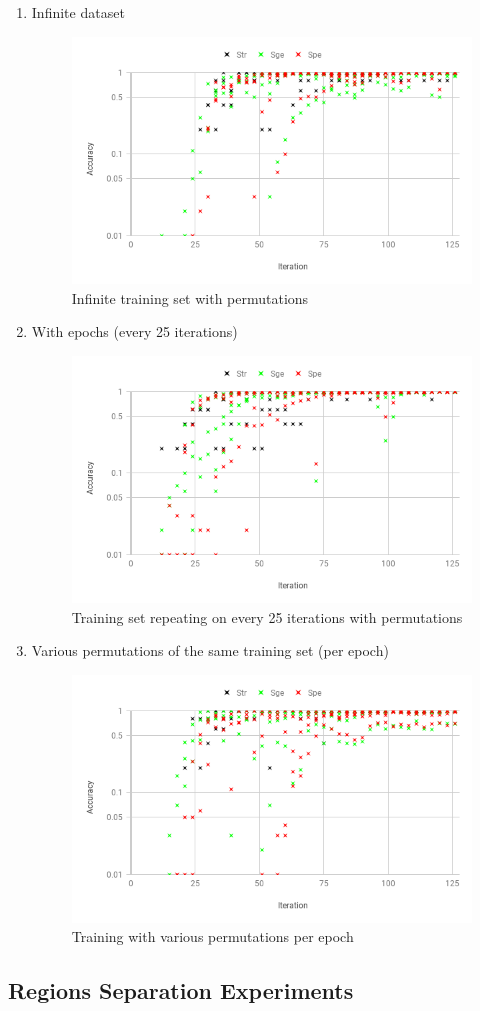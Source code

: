 \begin{itemize}
\begin{enumerate}[label=(\Alph*)]
        \item Infinite dataset
        
        \begin{figure}[H]
            \centering
            \includegraphics[width=.45\linewidth]{fig/content/results/shortest_path/training_perm_ACC.png}
            \caption{Infinite training set with permutations}
            \label{fig:shotest_paths_train_perm_ACC_results}
        \end{figure}
        
        \item With epochs (every 25 iterations)
        
        \begin{figure}[!htb]
            \centering
            \includegraphics[width=.45\linewidth]{fig/content/results/shortest_path/epochs_perm_ACC.png}
            \caption{Training set repeating on every 25 iterations with permutations}
            \label{fig:shotest_paths_epochs_perm_ACC_results}
        \end{figure}
        
        \item Various permutations of the same training set (per epoch)
        
        \begin{figure}[!htb]
            \centering
            \includegraphics[width=.45\linewidth]{fig/content/results/shortest_path/various_perms_per_epoch_ACC.png}
            \caption{Training with various permutations per epoch}
            \label{fig:shotest_paths_varios_perms_ACC_results}
        \end{figure}

    \end{enumerate}
    
\end{itemize}

\subsection{Regions Separation Experiments}
